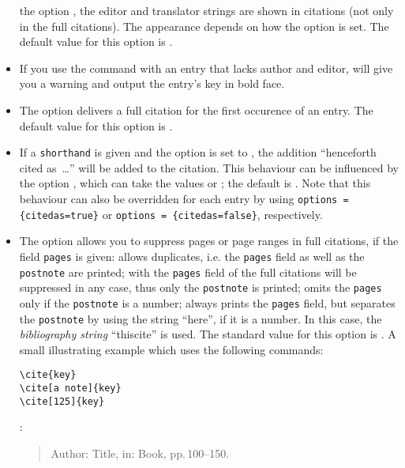 \documentclass[english]{scrartcl}
\begin{document}
\begin{itemize}
	      the option , the editor and 
	      translator strings are shown in citations (not only in the full 
	      citations). The appearance depends on how the option 
	      is set. The default value for this option is .
	\item If you use the  command with an entry that
	      lacks author and editor, \bl{} will give you a warning
	      and output the entry's key in bold face.
	\item The option  delivers a full citation for the first
	      occurence of an entry. The default value for this option is 
	      .
	\item If a \texttt{shorthand} is given and the option 
	      is set to , the addition \enquote{henceforth 
	      cited as~\ldots} will be added to the citation. This behaviour can
	      be influenced by the option , which can take
	      the values  or ; the default
	      is . Note that this behaviour can also be overridden
	      for each entry by using \texttt{options\,= \{citedas=true\}} or 
	      \texttt{options\,=\,\{citedas=false\}}, respectively.
  \item The
	      option  allows you to suppress pages or page ranges
				in full citations, if the field \texttt{pages} is given:
				 allows duplicates, i.e. the \texttt{pages}
				field as well as the \texttt{postnote} are printed;
				with  the \texttt{pages} field of the full citations
				will be suppressed in any case, thus only the \texttt{postnote} is printed;
				 omits the \texttt{pages} only if the \texttt{postnote}
				is a number;
				 always prints the \texttt{pages} field, but separates
				the \texttt{postnote} by using the string \enquote{here}, if it is a number. 
				In this case, the \emph{bibliography string} \enquote{thiscite} is used.
				The standard value for this option is .
				A small illustrating example which uses the following  commands:
				\begin{lstlisting}
\cite{key}
\cite[a note]{key}
\cite[125]{key}
				\end{lstlisting}
				:
				\begin{quote}
				Author: Title, in: Book, pp.\,100--150.


\end{quote}
\end{itemize}
\end{document}
